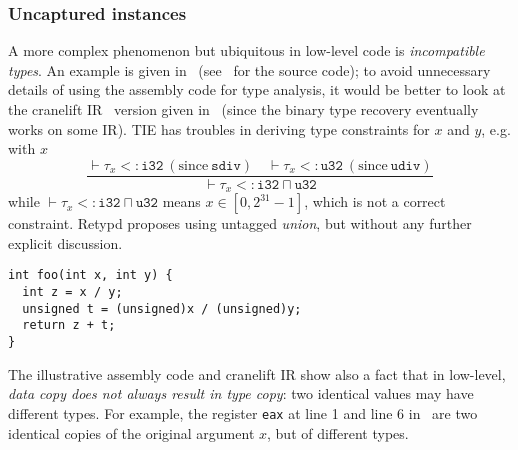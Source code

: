 \documentclass[compsoc,conference,a4paper,10pt,times]{IEEEtran}
\begin{document}
\subsubsection*{Uncaptured instances}
A more complex phenomenon but ubiquitous in low-level code is \emph{incompatible types}. An example is given in~ 
(see~ for the source code); to avoid unnecessary details of using the assembly 
code for type analysis, it would be better to look at the cranelift IR~\cite{noauthor_cranelift_nodate} version given in~ 
(since the binary type recovery eventually works on some IR).
TIE has troubles in deriving type constraints for $x$ and $y$, 
e.g. with $x$
\begin{equation*}
  \frac{\vdash \tau_{x} <\colon \mathtt{i32} \medspace (\text{since} \medspace \mathtt{sdiv}) \quad \vdash \tau_{x} <\colon \mathtt{u32} \medspace (\text{since} \medspace \mathtt{udiv})}
       {\vdash \tau_{x} <\colon \mathtt{i32} \sqcap \mathtt{u32}}
\end{equation*}
while $\vdash \tau_{x} <\colon \mathtt{i32} \sqcap \mathtt{u32}$ means $x \in [0, 2^{31}-1]$, 
which is not a correct constraint. Retypd proposes using untagged \emph{union}, but without any further explicit 
discussion.
\begin{lstlisting}[style={c},caption={Signed and unsigned division (source)},label={lst:divisionc}]
int foo(int x, int y) {
  int z = x / y;
  unsigned t = (unsigned)x / (unsigned)y;
  return z + t;
}
\end{lstlisting}
The illustrative assembly code and cranelift IR show also a fact that in low-level, 
\emph{data copy does not always result in type copy}: two identical values 
may have different types. For example, 
the register \texttt{\small eax} at line 1 and line 6 in~ are two identical copies of 
the original argument $x$, but of different types.
\end{document}
